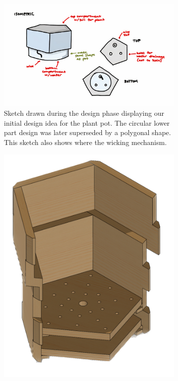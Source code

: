 \documentclass[12pt]{extarticle} %
\begin{document}
\begin{figure}[H]
     \centering
     \begin{subfigure}[b]{0.65\textwidth}
         \centering
         \includegraphics[width=\textwidth]{images/sketches/initial_plant_pot_idea.jpeg}
         \caption{Sketch drawn during the design phase displaying our initial design idea for the plant pot. The circular lower part design was later superseded by a polygonal shape. This sketch also shows where the wicking mechanism.}
         \label{fig:initial_plant_pot_sketch}
     \end{subfigure}
     \hfill
     \begin{subfigure}[b]{0.3\textwidth}
         \centering
         \includegraphics[width=\textwidth]{images/screenshots/pent_pot_half_transparent.png}

\end{subfigure}
\end{figure}
\end{document}
